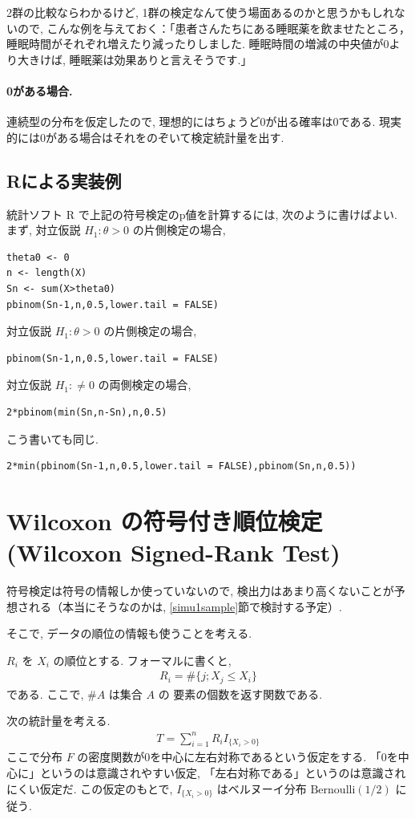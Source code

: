 \documentclass[12pt]{jsarticle}
\begin{document}
2群の比較ならわかるけど, 1群の検定なんて使う場面あるのかと思うかもしれないので, こんな例を与えておく：「患者さんたちにある睡眠薬を飲ませたところ，　睡眠時間がそれぞれ増えたり減ったりしました. 睡眠時間の増減の中央値が0より大きけば, 睡眠薬は効果ありと言えそうです.」

\paragraph{0がある場合.} 
連続型の分布を仮定したので, 理想的にはちょうど0が出る確率は0である.
現実的には0がある場合はそれをのぞいて検定統計量を出す.

\subsection{Rによる実装例}

統計ソフト R で上記の符号検定のp値を計算するには, 次のように書けばよい.
まず, 対立仮説 $H_1: \theta > 0$ の片側検定の場合,
\begin{verbatim}
theta0 <- 0
n <- length(X)
Sn <- sum(X>theta0)
pbinom(Sn-1,n,0.5,lower.tail = FALSE)
\end{verbatim}
対立仮説 $H_1: \theta > 0$ の片側検定の場合, 
\begin{verbatim}
pbinom(Sn-1,n,0.5,lower.tail = FALSE)
\end{verbatim}
対立仮説 $H_1: \neq  0$ の両側検定の場合, 
\begin{verbatim}
2*pbinom(min(Sn,n-Sn),n,0.5)
\end{verbatim}
こう書いても同じ.
\begin{verbatim}
2*min(pbinom(Sn-1,n,0.5,lower.tail = FALSE),pbinom(Sn,n,0.5))
\end{verbatim}

\section{Wilcoxon の符号付き順位検定(Wilcoxon Signed-Rank Test)}
符号検定は符号の情報しか使っていないので, 検出力はあまり高くないことが予想される（本当にそうなのかは, \ref{simu1sample}節で検討する予定）.

そこで, データの順位の情報も使うことを考える. 

$R_i$ を $X_i$ の順位とする.
フォーマルに書くと,
\begin{align}
R_i = \#\{j;X_j\le X_i\}
\end{align}
である. ここで, $\#A$ は集合 $A$ の 要素の個数を返す関数である.

次の統計量を考える.
\begin{align}
T = \sum_{i=1}^{n}R_i I_{\{X_i>0\}}
\end{align}
ここで分布 $F$ の密度関数が0を中心に左右対称であるという仮定をする. 「0を中心に」というのは意識されやすい仮定, 「左右対称である」というのは意識されにくい仮定だ.
この仮定のもとで, $ I_{\{X_i>0\}}$ はベルヌーイ分布 $\mathrm{Bernoulli}(1/2)$ に従う.
\end{document}
